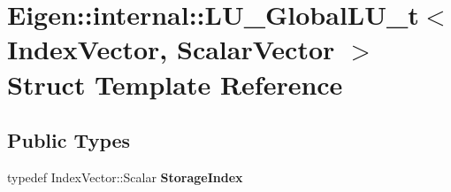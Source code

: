 \hypertarget{struct_eigen_1_1internal_1_1_l_u___global_l_u__t}{}\section{Eigen\+::internal\+::L\+U\+\_\+\+Global\+L\+U\+\_\+t$<$ Index\+Vector, Scalar\+Vector $>$ Struct Template Reference}
\label{struct_eigen_1_1internal_1_1_l_u___global_l_u__t}
\subsection*{Public Types}
\begin{DoxyCompactItemize}
\item 
\mbox{\label{struct_eigen_1_1internal_1_1_l_u___global_l_u__t_a96818e6cada6723e24e9f7b218c446b3}} 
typedef Index\+Vector\+::\+Scalar {\bfseries Storage\+Index}
\end{DoxyCompactItemize}
